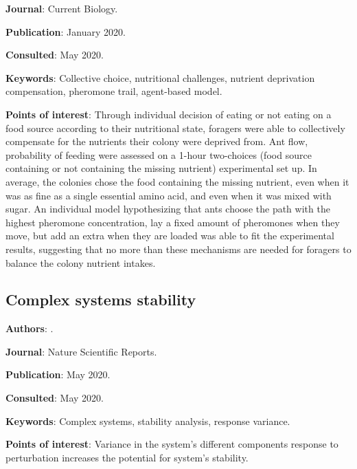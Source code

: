 \documentclass[12pt,a4paper]{article}
\begin{document}
\textbf{Journal}: Current Biology.

\textbf{Publication}: January 2020.

\textbf{Consulted}: May 2020.

\textbf{Keywords}: Collective choice, nutritional challenges, nutrient deprivation compensation, pheromone trail, agent-based model.

\textbf{Points of interest}: Through individual decision of eating or not eating on a food source according to their nutritional state, foragers were able to collectively compensate for the nutrients their colony were deprived from. Ant flow, probability of feeding were assessed on a 1-hour two-choices (food source containing or not containing the missing nutrient) experimental set up. In average, the colonies chose the food containing the missing nutrient, even when it was as fine as a single essential amino acid, and even when it was mixed with sugar. An individual model hypothesizing that ants choose the path with the highest pheromone concentration, lay a fixed amount of pheromones when they move, but add an extra when they are loaded was able to fit the experimental results, suggesting that no more than these mechanisms are needed for foragers to balance the colony nutrient intakes. 

\newpage

\subsection*{Complex systems stability}

\textbf{Authors}: \cite{duthie2020component}.

\textbf{Journal}: Nature Scientific Reports.

\textbf{Publication}: May 2020.

\textbf{Consulted}: May 2020.

\textbf{Keywords}: Complex systems, stability analysis, response variance.

\textbf{Points of interest}: Variance in the system's different components response to perturbation increases the potential for system's stability.

\newpage

\newpage

\nocite{*}
\end{document}
